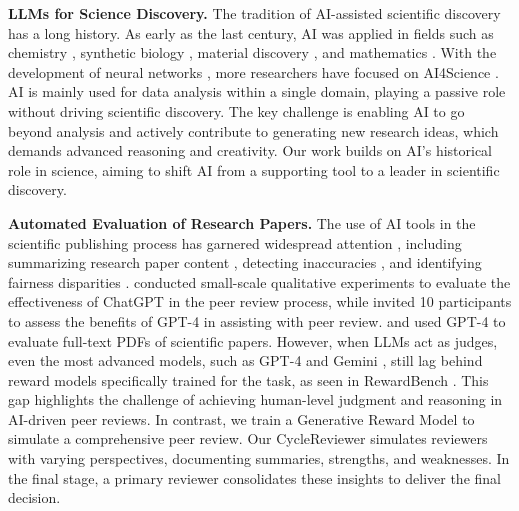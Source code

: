\documentclass{article} %
\begin{document}
\textbf{LLMs for Science Discovery.} The tradition of AI-assisted scientific discovery \citep{langley1987scientific,langley2024integrated} has a long history. As early as the last century, AI was applied in fields such as chemistry \citep{buchanan1981dendral}, synthetic biology \citep{jumper2021highly,hayes2024simulating}, material discovery \citep{pyzer2022accelerating,merchant2023scaling}, and mathematics \citep{romera2024mathematical}. With the development of neural networks \citep{lecun2015deep}, more researchers have focused on AI4Science \citep{ai4science2023impact,li2024ai4r,yakaboski2023ai}. 
AI is mainly used for data analysis within a single domain, playing a passive role without driving scientific discovery. The key challenge is enabling AI to go beyond analysis and actively contribute to generating new research ideas, which demands advanced reasoning and creativity. Our work builds on AI’s historical role in science, aiming to shift AI from a supporting tool to a leader in scientific discovery.

\textbf{Automated Evaluation of Research Papers.} The use of AI tools in the scientific publishing process has garnered widespread attention \citep{bao2021predicting,liu2023reviewergpt,liang2024can,d2024marg}, including summarizing research paper content \citep{collins2017supervised}, detecting inaccuracies \citep{nuijten2016prevalence}, and identifying fairness disparities \citep{zhang2022investigating}. \citet{hosseini2023fighting} conducted small-scale qualitative experiments to evaluate the effectiveness of ChatGPT in the peer review process, while \citet{robertson2023gpt4} invited 10 participants to assess the benefits of GPT-4 in assisting with peer review. \citet{lu2024ai} and \citet{tyser2024ai} used GPT-4 to evaluate full-text PDFs of scientific papers. However, when LLMs act as judges, even the most advanced models, such as GPT-4 \citep{achiam2023gpt} and Gemini \citep{reid2024gemini}, still lag behind reward models specifically trained for the task, as seen in RewardBench \citep{lambert2024rewardbench}. This gap highlights the challenge of achieving human-level judgment and reasoning in AI-driven peer reviews. In contrast, we train a Generative Reward Model \citep{zhang2024generative} to simulate a comprehensive peer review. Our CycleReviewer simulates reviewers with varying perspectives, documenting summaries, strengths, and weaknesses. In the final stage, a primary reviewer consolidates these insights to deliver the final decision.

\end{document}
